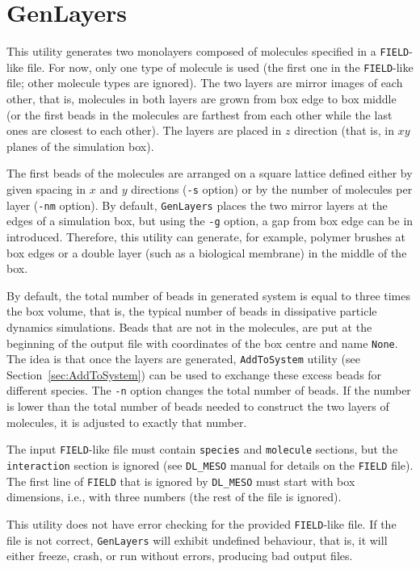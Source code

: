 \section{GenLayers} \label{sec:GenLayers}

This utility generates two monolayers composed of molecules specified in a
\texttt{FIELD}-like file. For now, only one type of molecule is used (the
first one in the \texttt{FIELD}-like file; other molecule types are
ignored). The two layers are mirror images of each other, that is,
molecules in both layers are grown from box edge to box middle (or the
first beads in the molecules are farthest from each other while the last
ones are closest to each other). The layers are placed in $z$ direction
(that is, in $xy$ planes of the simulation box).

The first beads of the molecules are arranged on a square lattice defined
either by given spacing in $x$ and $y$ directions (\texttt{-s} option) or
by the number of molecules per layer (\texttt{-nm} option). By default,
\texttt{GenLayers} places the two mirror layers at the edges of a
simulation box, but using the \texttt{-g} option, a gap from box edge can
be in introduced. Therefore, this utility can generate, for example,
polymer brushes at box edges or a double layer (such as a biological
membrane) in the middle of the box.

By default, the total number of beads in generated system is equal to three
times the box volume, that is, the typical number of beads in dissipative
particle dynamics simulations. Beads that are not in the molecules, are put
at the beginning of the output file with coordinates of the box centre and
name \texttt{None}. The idea is that once the layers are generated,
\texttt{AddToSystem} utility (see Section~\ref{sec:AddToSystem}) can be
used to exchange these excess beads for different species. The \texttt{-n}
option changes the total number of beads. If the number is lower than the
total number of beads needed to construct the two layers of molecules, it
is adjusted to exactly that number.

The input \texttt{FIELD}-like file must contain \texttt{species} and
\texttt{molecule} sections, but the \texttt{interaction} section is ignored
(see \texttt{DL\_MESO} manual for details on the \texttt{FIELD} file). The
first line of \texttt{FIELD} that is ignored by \texttt{DL\_MESO} must
start with box dimensions, i.e., with three numbers (the rest of the file
is ignored).

This utility does not have error checking for the provided
\texttt{FIELD}-like file. If the file is not correct, \texttt{GenLayers}
will exhibit undefined behaviour, that is, it will either freeze, crash, or
run without errors, producing bad output files.

